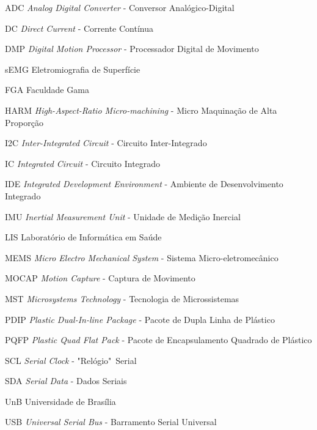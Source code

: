 \begin{siglas}

   \item[ADC]	\textit{Analog Digital Converter} - Conversor Analógico-Digital					
   \item[DC]	\textit{Direct Current} - Corrente Contínua						
   \item[DMP]	\textit{Digital Motion Processor} -	Processador	Digital	de	Movimento			
   \item[sEMG]	Eletromiografia de Superfície										
   \item[FGA]	Faculdade Gama									
   \item[HARM]	\textit{High-Aspect-Ratio Micro-machining} - Micro Maquinação de Alta Proporção			
   \item[I2C]	\textit{Inter-Integrated Circuit} -	Circuito Inter-Integrado						
   \item[IC]	\textit{Integrated	Circuit} - Circuito	Integrado						
   \item[IDE]	\textit{Integrated	Development	Environment} - Ambiente	de Desenvolvimento Integrado			
   \item[IMU]	\textit{Inertial Measurement Unit} - Unidade de	Medição	Inercial			
   \item[LIS]	Laboratório	de Informática em Saúde						
   \item[MEMS]	\textit{Micro Electro Mechanical System} - Sistema Micro-eletromecânico				
   \item[MOCAP]	\textit{Motion Capture} - Captura	de Movimento					
   \item[MST]	\textit{Microsystems Technology} - Tecnologia de Microssistemas					
   \item[PDIP]	\textit{Plastic Dual-In-line Package} - Pacote de Dupla Linha de Plástico	
   \item[PQFP]	\textit{Plastic	Quad Flat Pack} - Pacote de	Encapsulamento Quadrado de Plástico
   \item[SCL]	\textit{Serial Clock} -	"Relógio"\ Serial						
   \item[SDA]	\textit{Serial Data} - Dados Seriais						
   \item[UnB]	Universidade de	Brasília								
   \item[USB]	\textit{Universal Serial Bus} -	Barramento Serial Universal				
   
\end{siglas}
